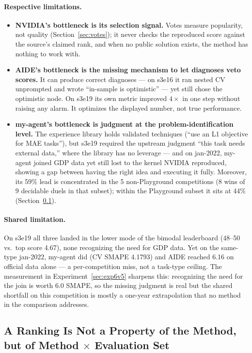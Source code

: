 \documentclass[11pt,a4paper]{article}
\begin{document}
\paragraph{Respective limitations.}
\begin{itemize}[leftmargin=*]
\item \textbf{NVIDIA's bottleneck is its selection signal.} Votes measure popularity, not quality (Section~\ref{sec:votes}); it never checks the reproduced score against the source's claimed rank, and when no public solution exists, the method has nothing to work with.
\item \textbf{AIDE's bottleneck is the missing mechanism to let diagnoses veto scores.} It can produce correct diagnoses --- on s3e16 it ran nested CV unprompted and wrote ``in-sample is optimistic'' --- yet still chose the optimistic node. On s3e19 its own metric improved $4\times$ in one step without raising any alarm. It optimizes the displayed number, not true performance.
\item \textbf{my-agent's bottleneck is judgment at the problem-identification level.} The experience library holds validated techniques (``use an L1 objective for MAE tasks''), but s3e19 required the upstream judgment ``this task needs external data,'' where the library has no leverage --- and on jan-2022, my-agent joined GDP data yet still lost to the kernel NVIDIA reproduced, showing a gap between having the right idea and executing it fully. Moreover, its 59\% lead is concentrated in the 5 non-Playground competitions (8 wins of 9 decidable duels in that subset); within the Playground subset it sits at 44\% (Section~\ref{sec:reversal}).
\end{itemize}

\paragraph{Shared limitation.} On s3e19 all three landed in the lower mode of the bimodal leaderboard (48--50 vs.\ top score 4.67), none recognizing the need for GDP data. Yet on the same-type jan-2022, my-agent did (CV SMAPE 4.1793) and AIDE reached 6.16 on official data alone --- a per-competition miss, not a task-type ceiling. The measurement in Experiment~\ref{sec:exp6v5} sharpens this: recognizing the need for the join is worth $6.0$ SMAPE, so the missing judgment is real but the shared shortfall on this competition is mostly a one-year extrapolation that no method in the comparison addresses.

\subsection{A Ranking Is Not a Property of the Method, but of Method $\times$ Evaluation Set}
\label{sec:reversal}
\end{document}
